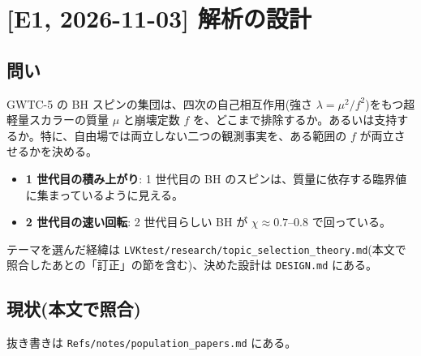 \section{[E1, 2026-11-03] 解析の設計}\label{sec:e01}

\subsection{問い}

GWTC-5 の BH スピンの集団は、四次の自己相互作用(強さ $\lambda=\mu^2/f^2$)をもつ超軽量スカラーの質量 $\mu$ と崩壊定数 $f$ を、どこまで排除するか。あるいは支持するか。特に、自由場では両立しない二つの観測事実を、ある範囲の $f$ が両立させるかを決める。
\begin{itemize}
\item \textbf{1 世代目の積み上がり}: 1 世代目の BH のスピンは、質量に依存する臨界値に集まっているように見える。
\item \textbf{2 世代目の速い回転}: 2 世代目らしい BH が $\chi\approx0.7$--$0.8$ で回っている。
\end{itemize}
テーマを選んだ経緯は \texttt{LVKtest/research/topic\_selection\_theory.md}(本文で照合したあとの「訂正」の節を含む)、決めた設計は \texttt{DESIGN.md} にある。

\subsection{現状(本文で照合)}

抜き書きは \texttt{Refs/notes/population\_papers.md} にある。


